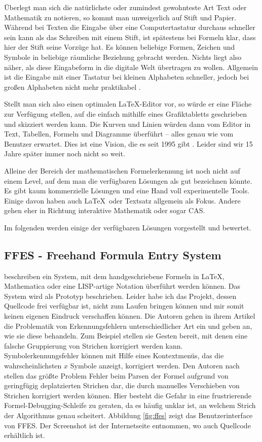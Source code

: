 Überlegt man sich die natürlichste oder zumindest gewohnteste Art Text oder Mathematik zu notieren, so kommt man unweigerlich auf Stift und Papier. Während bei Texten die Eingabe über eine Computertastatur durchaus schneller sein kann als das Schreiben mit einem Stift, ist spätestens bei Formeln klar, dass hier der Stift seine Vorzüge hat. Es können beliebige Formen, Zeichen und Symbole in beliebige räumliche Beziehung gebracht werden. Nichts liegt also näher, als diese Eingabeform in die digitale Welt übertragen zu wollen. Allgemein ist die Eingabe mit einer Tastatur bei kleinen Alphabeten schneller, jedoch bei großen Alphabeten nicht mehr praktikabel \cite{Tappert:1990p10302}.

Stellt man sich also einen optimalen \LaTeX-Editor vor, so würde er eine Fläche zur Verfügung stellen, auf die einfach mithilfe eines Grafiktabletts geschrieben und skizziert werden kann. Die Kurven und Linien würden dann vom Editor in Text, Tabellen, Formeln und Diagramme überführt -- alles genau wie vom Benutzer erwartet. Dies ist eine Vision, die es seit 1995 gibt \cite{Meyer:1995p10480}. Leider sind wir 15 Jahre später immer noch nicht so weit.

Alleine der Bereich der mathematischen Formelerkennung ist noch nicht auf einem Level, auf dem man die verfügbaren Lösungen als gut bezeichnen könnte. Es gibt kaum kommerzielle Lösungen und eine Hand voll experimentelle Tools. Einige davon haben auch \LaTeX~oder Textsatz allgemein als Fokus. Andere gehen eher in Richtung interaktive Mathematik oder sogar \ac{CAS}.

Im folgenden werden einige der verfügbaren Lösungen vorgestellt und bewertet.

\subsection[FFES]{FFES - Freehand Formula Entry System}
\label{sub:ffes}

\citet{Smithies:1999p11806} beschreiben ein System, mit dem handgeschriebene Formeln in \LaTeX, Mathematica oder eine LISP-artige Notation überführt werden können. Das System wird als Prototyp beschrieben. Leider habe ich das Projekt, dessen Quellcode frei verfügbar ist, nicht zum Laufen bringen können und mir somit keinen eigenen Eindruck verschaffen können. Die Autoren gehen in ihrem Artikel die Problematik von Erkennungsfehlern unterschiedlicher Art ein und geben an, wie sie diese behandeln. Zum Beispiel stellen sie Gesten bereit, mit denen eine falsche Gruppierung von Strichen korrigiert werden kann. Symbolerkennungsfehler können mit Hilfe eines Kontextmenüs, das die wahrscheinlichsten $x$ Symbole anzeigt, korrigiert werden. Den Autoren nach stellen das größte Problem Fehler beim Parsen der Formel aufgrund von geringfügig deplatzierten Strichen dar, die durch manuelles Verschieben von Strichen korrigiert werden können. Hier besteht die Gefahr in eine frustrierende Formel-Debugging-Schleife zu geraten, da es häufig unklar ist, an welchem Strich der Algorithmus genau scheitert. Abbildung \ref{fig:ffes} zeigt das Benutzerinterface von FFES. Der Screenshot ist der Internetseite \cite{ffes} entnommen, wo auch Quellcode erhältlich ist.

